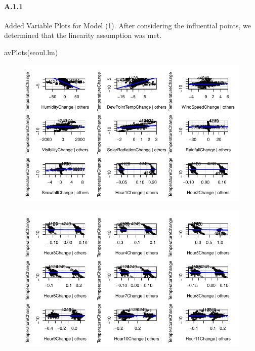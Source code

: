 \documentclass[
  letterpaper,
  DIV=11,
  numbers=noendperiod]{scrartcl}
\let\oldparagraph\paragraph
\renewcommand{\paragraph}[1]{\oldparagraph{#1}\mbox{}}
\newenvironment{Shaded}{\begin{snugshade}}{\end{snugshade}}
\newcommand{\FunctionTok}[1]{\textcolor[rgb]{0.28,0.35,0.67}{#1}}
\newcommand{\NormalTok}[1]{\textcolor[rgb]{0.00,0.23,0.31}{#1}}
\begin{document}
\hypertarget{a11}{%
\paragraph{A.1.1}\label{a11}}

Added Variable Plots for Model (1). After considering the influential
points, we determined that the linearity assumption was met.

\begin{Shaded}
\begin{Highlighting}[]
\FunctionTok{avPlots}\NormalTok{(seoul.lm)}
\end{Highlighting}
\end{Shaded}

\begin{figure}[H]

{\centering \includegraphics{seoul_files/figure-pdf/unnamed-chunk-10-1.pdf}

}

\end{figure}

\begin{figure}[H]

{\centering \includegraphics{seoul_files/figure-pdf/unnamed-chunk-10-2.pdf}

}

\end{figure}
\end{document}
